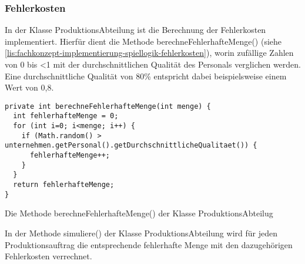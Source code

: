 \subsubsection{Fehlerkosten}
\label{subsub:fachkonzept-implementierung-spiellogik-fehlerkosten}

In der Klasse ProduktionsAbteilung ist die Berechnung der Fehlerkosten implementiert. Hierfür dient die Methode berechneFehlerhafteMenge() (siehe \ref{lis:fachkonzept-implementierung-spiellogik-fehlerkosten}), worin zufällige Zahlen von 0 bis <1 mit der durchschnittlichen Qualität des Personals verglichen werden. Eine durchschnittliche Qualität von 80\% entspricht dabei beispielsweise einem Wert von 0,8. 

\begin{programm}[htbp]
\begin{lstlisting}[breaklines=true]
private int berechneFehlerhafteMenge(int menge) {
  int fehlerhafteMenge = 0;
  for (int i=0; i<menge; i++) {
    if (Math.random() > unternehmen.getPersonal().getDurchschnittlicheQualitaet()) {
	  fehlerhafteMenge++;
	}
  }
  return fehlerhafteMenge;
}
\end{lstlisting}
\caption{Die Methode berechneFehlerhafteMenge() der Klasse ProduktionsAbteilug\label{lis:fachkonzept-implementierung-spiellogik-fehlerkosten}}
\end{programm}

In der Methode simuliere() der Klasse ProduktionsAbteilung wird für jeden Produktionsauftrag die entsprechende fehlerhafte Menge mit den dazugehörigen Fehlerkosten verrechnet. 




